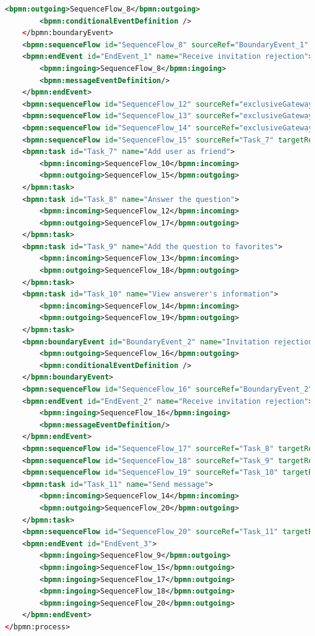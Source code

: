 \documentclass[runningheads]{llncs}
\begin{document}
\begin{lstlisting}[language={XML}]
        <bpmn:outgoing>SequenceFlow_8</bpmn:outgoing>
        <bpmn:conditionalEventDefinition />
    </bpmn:boundaryEvent>
    <bpmn:sequenceFlow id="SequenceFlow_8" sourceRef="BoundaryEvent_1" targetRef="EndEvent_1" />
    <bpmn:endEvent id="EndEvent_1" name="Receive invitation rejection">
        <bpmn:ingoing>SequenceFlow_8</bpmn:ingoing>
        <bpmn:messageEventDefinition/>
    </bpmn:endEvent>
    <bpmn:sequenceFlow id="SequenceFlow_12" sourceRef="exclusiveGateway_2" targetRef="Task_8" />
    <bpmn:sequenceFlow id="SequenceFlow_13" sourceRef="exclusiveGateway_2" targetRef="Task_9" />
    <bpmn:sequenceFlow id="SequenceFlow_14" sourceRef="exclusiveGateway_2" targetRef="Task_10" />
    <bpmn:sequenceFlow id="SequenceFlow_15" sourceRef="Task_7" targetRef="EndEvent_3" />
    <bpmn:task id="Task_7" name="Add user as friend">
        <bpmn:incoming>SequenceFlow_10</bpmn:incoming>
        <bpmn:outgoing>SequenceFlow_15</bpmn:outgoing>
    </bpmn:task>
    <bpmn:task id="Task_8" name="Answer the question">
        <bpmn:incoming>SequenceFlow_12</bpmn:incoming>
        <bpmn:outgoing>SequenceFlow_17</bpmn:outgoing>
    </bpmn:task>
    <bpmn:task id="Task_9" name="Add the question to favorites">
        <bpmn:incoming>SequenceFlow_13</bpmn:incoming>
        <bpmn:outgoing>SequenceFlow_18</bpmn:outgoing>
    </bpmn:task>
    <bpmn:task id="Task_10" name="View answerer's information">
        <bpmn:incoming>SequenceFlow_14</bpmn:incoming>
        <bpmn:outgoing>SequenceFlow_19</bpmn:outgoing>
    </bpmn:task>
    <bpmn:boundaryEvent id="BoundaryEvent_2" name="Invitation rejection" attachedToRef="Task_7">
        <bpmn:outgoing>SequenceFlow_16</bpmn:outgoing>
        <bpmn:conditionalEventDefinition />
    </bpmn:boundaryEvent>
    <bpmn:sequenceFlow id="SequenceFlow_16" sourceRef="BoundaryEvent_2" targetRef="EndEvent_2" />
    <bpmn:endEvent id="EndEvent_2" name="Receive invitation rejection">
        <bpmn:ingoing>SequenceFlow_16</bpmn:ingoing>
        <bpmn:messageEventDefinition/>
    </bpmn:endEvent>
    <bpmn:sequenceFlow id="SequenceFlow_17" sourceRef="Task_8" targetRef="EndEvent_3" />
    <bpmn:sequenceFlow id="SequenceFlow_18" sourceRef="Task_9" targetRef="EndEvent_3" />
    <bpmn:sequenceFlow id="SequenceFlow_19" sourceRef="Task_10" targetRef="Task_11" />
    <bpmn:task id="Task_11" name="Send message">
        <bpmn:incoming>SequenceFlow_14</bpmn:incoming>
        <bpmn:outgoing>SequenceFlow_20</bpmn:outgoing>
    </bpmn:task>
    <bpmn:sequenceFlow id="SequenceFlow_20" sourceRef="Task_11" targetRef="EndEvent_3" />
    <bpmn:endEvent id="EndEvent_3">
        <bpmn:ingoing>SequenceFlow_9</bpmn:outgoing>
        <bpmn:ingoing>SequenceFlow_15</bpmn:outgoing>
        <bpmn:ingoing>SequenceFlow_17</bpmn:outgoing>
        <bpmn:ingoing>SequenceFlow_18</bpmn:outgoing>
        <bpmn:ingoing>SequenceFlow_20</bpmn:outgoing>
    </bpmn:endEvent>
</bpmn:process>
\end{lstlisting}
\end{document}
